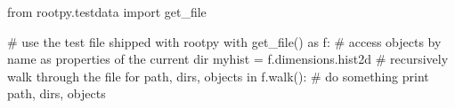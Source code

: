 \begin{footnotesize}
\begin{pyglist}[language=python,texcl=true,abovecaptionskip=0,style=vs,bgcolor=Moccasin]
from rootpy.testdata import get_file

# use the test file shipped with rootpy
with get_file() as f:
    # access objects by name as properties of the current dir
    myhist = f.dimensions.hist2d
    # recursively walk through the file
    for path, dirs, objects in f.walk():
        # do something
        print path, dirs, objects
\end{pyglist}
\end{footnotesize}
